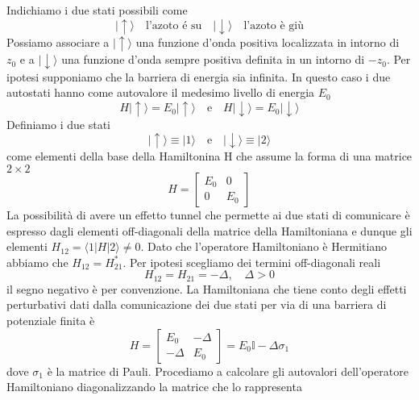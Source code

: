 Indichiamo i due stati possibili come 
\begin{equation*}
	|\uparrow \rangle \quad \text{l'azoto \'e su} \quad |\downarrow \rangle \quad \text{l'azoto \`e gi\`u} 
\end{equation*}
Possiamo associare a $|\uparrow \rangle $ una funzione d'onda positiva localizzata in intorno di $z_0$ e a $|\downarrow \rangle$ una funzione d'onda sempre positiva definita in un intorno di $-z_0$. Per ipotesi supponiamo che la barriera di energia sia infinita. In questo caso i due autostati hanno come autovalore il medesimo livello di energia $E_0$
\begin{equation*}
	H |\uparrow \rangle = E_0 |\uparrow \rangle \quad \text{e} \quad H|\downarrow \rangle = E_0 |\downarrow \rangle 
\end{equation*}
Definiamo i due stati 
\begin{equation*}
	|\uparrow \rangle \equiv |1 \rangle \quad \text{e} \quad |\downarrow \rangle \equiv |2 \rangle
\end{equation*}
come elementi della base della Hamiltonina H che assume la forma di una matrice $2 \times 2$
\begin{equation*}
	H = \left [\begin{array}{cc}
		E_0 & 0 \\ 0 & E_0
	\end{array} \right]
\end{equation*}
La possibilit\`a di avere un effetto tunnel che permette ai due stati di comunicare \`e espresso dagli elementi off-diagonali della matrice della Hamiltoniana e dunque gli elementi $H_{12} = \langle 1|H|2\rangle \neq 0$. Dato che l'operatore Hamiltoniano \`e Hermitiano abbiamo che $H_{12} = H_{21}^*$. Per ipotesi scegliamo dei termini off-diagonali reali 
\begin{equation*}
	H_{12} =H_{21} = - \Delta, \quad \Delta > 0
\end{equation*} 
il segno negativo \`e per convenzione. La Hamiltoniana che tiene conto degli effetti perturbativi dati dalla comunicazione dei due stati per via di una barriera di potenziale finita \`e 
\begin{equation*}
	H = \left [ \begin{array}{cc}
		E_0 & -\Delta \\ - \Delta & E_0 
	\end{array}\right ]=E_0\mathbb{I} - \Delta \sigma_1
\end{equation*}
dove $\sigma_1$ \`e la matrice di Pauli. Procediamo a calcolare gli autovalori dell'operatore Hamiltoniano diagonalizzando la matrice che lo rappresenta
